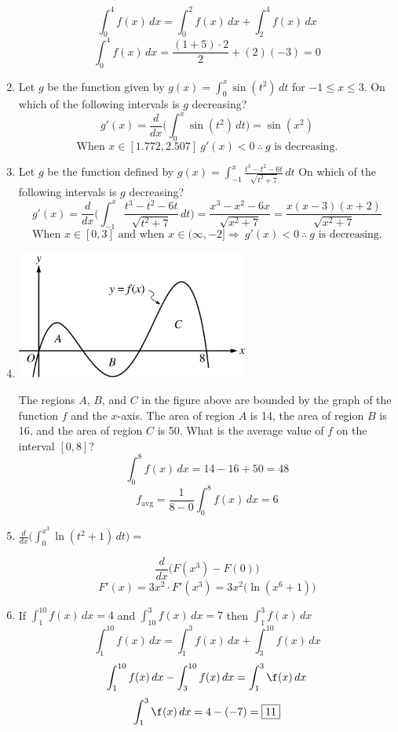 \documentclass[12pt]{article}
\begin{document}
\begin{enumerate}
    $$\int_{0}^{4} f(x) \, dx = \int_{0}^{2} f(x) \, dx + \int_{2}^{4} f(x) \, dx$$
    $$\int_{0}^{4} f(x) \, dx =\frac{(1+5)\cdot 2}{2} + (2)(-3)= \boxed{0} $$
    \item Let $g$ be the function given by $g(x)=\int_{0}^{x} \sin(t^2) \, dt$ for $-1 \leq x \leq 3$. On which of the following intervals is $g$ decreasing?
    $$g'(x) = \frac{d}{dx} \biggr( \int_{0}^{x} \sin(t^2) \, dt \biggr) = \sin(x^2)$$
    $$\boxed{\text{When } x\in[1.772, 2.507] \: g'(x)<0 \: \therefore \: g \text{ is decreasing.}}$$
    \item Let $g$ be the function defined by $g(x)= \int_{-1}^{x}\frac{t^3-t^2-6t}{\sqrt{t^2+7}}\,dt $ On which of the following intervals is $g$ decreasing?
    $$g'(x)=\frac{d}{dx}\biggr(\int_{-1}^{x}\frac{t^3-t^2-6t}{\sqrt{t^2+7}}\,dt \biggr) =\frac{x^3-x^2-6x}{\sqrt{x^2+7}}=\frac{x(x-3)(x+2)}{\sqrt{x^2+7}}$$
    $$\boxed{\text{When } x\in[0, 3] \text{ and when } x\in(\infty,-2] \Longrightarrow\: g'(x)<0 \: \therefore \: g \text{ is decreasing.}}$$
    \newpage
    \item 
    \begin{center}
        \includegraphics[width=3in]{original-25.png}
    \end{center}
    The regions $A$, $B$, and $C$ in the figure above are bounded by the graph of the function $f$ and the $x$-axis. The area of region $A$ is 14, the area of region $B$ is 16, and the area of region $C$ is 50. What is the average value of $f$ on the interval $[0,8]$?
    $$\int_{0}^{8} f(x) \, dx = 14-16+50=48$$
    $$f_{\text{avg}}= \frac{1}{8-0} \int_{0}^{8} f(x) \, dx = \boxed{6}$$
    
    \item $\frac{d}{dx} \biggr( \int_{0}^{x^3} \ln(t^2+1) \, dt \biggr)=$

$$\frac{d}{dx}\biggr( F(x^3)-F(0) \biggr)$$
 $$F'(x)=3x^2 \cdot F'(x^3)= \boxed{3x^2 \big( \ln(x^6+1) \big)}$$

    \item If $\int_{1}^{10} f(x) \,dx =4$ and $\int_{10}^{3} f(x) \, dx =7$ then $\int_{1}^{3} f(x) \, dx$
    $$\int_{1}^{10} f(x) \, dx = \int_{1}^{3} f(x) \,dx + \int_{3}^{10} f(x) \, dx$$
    $$\int_{1}^{10} f(x) \,dx - \int_{3}^{10} f(x) \,dx = \int_{1}^{3} \f(x) \,dx $$
    $$\int_{1}^{3} \f(x) \,dx = 4 - (-7) = \boxed{11}$$
    
\end{enumerate}
\end{document}
